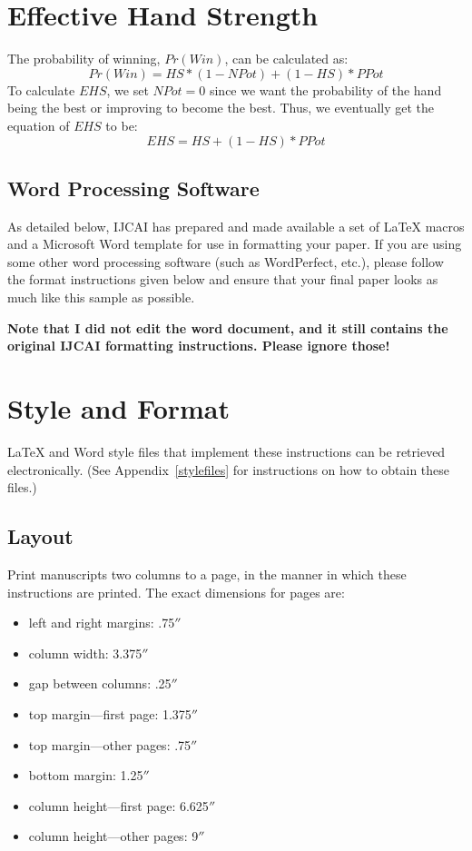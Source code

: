 \documentclass{article}
\begin{document}
\section{Effective Hand Strength}
The probability of winning, $Pr(Win)$, can be calculated as:
\begin{displaymath}
  Pr(Win) = HS * (1-NPot) + (1-HS) * PPot
\end{displaymath}
To calculate $EHS$, we set $NPot=0$ since we want the probability of the hand being the best or improving to become the best. Thus, we eventually get the equation of $EHS$ to be:
\begin{displaymath}
  EHS = HS +(1-HS) * PPot
\end{displaymath}

\subsection{Word Processing Software}

As detailed below, IJCAI has prepared and made available a set of
\LaTeX{} macros and a Microsoft Word template for use in formatting
your paper. If you are using some other word processing software (such
as WordPerfect, etc.), please follow the format instructions given
below and ensure that your final paper looks as much like this sample
as possible.

{\bf Note that I did not edit the word document, and it still contains the original IJCAI formatting instructions. Please ignore those!}

\section{Style and Format}

\LaTeX{} and Word style files that implement these instructions
can be retrieved electronically. (See Appendix~\ref{stylefiles} for
instructions on how to obtain these files.)

\subsection{Layout}

Print manuscripts two columns to a page, in the manner in which these
instructions are printed. The exact dimensions for pages are:
\begin{itemize}
\item left and right margins: .75$''$
\item column width: 3.375$''$
\item gap between columns: .25$''$
\item top margin---first page: 1.375$''$
\item top margin---other pages: .75$''$
\item bottom margin: 1.25$''$
\item column height---first page: 6.625$''$
\item column height---other pages: 9$''$
\end{itemize}
\end{document}

